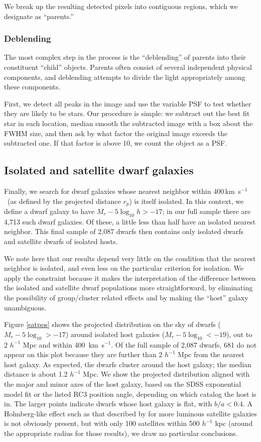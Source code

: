 \documentclass[10pt,preprint]{aastex}
\newcommand{\kms}{\,km~s$^{-1}$}
\begin{document}
We break up the resulting detected pixels into contiguous regions,
which we designate as ``parents.''

\subsubsection{Deblending}

The most complex step in the process is the ``deblending'' of parents
into their constituent ``child'' objects. Parents often consist of
several independent physical components, and deblending attempts to
divide the light appropriately among these components.

First, we detect all peaks in the image and use the variable PSF to
test whether they are likely to be stars. Our procedure is simple: we
subtract out the best fit star in each location, median smooth the
subtracted image with a box about the FWHM size, and then ask by what
factor the original image exceeds the subtracted one.  If that factor
is above 10, we count the object as a PSF. 

\subsection{ Isolated and satellite dwarf galaxies}

Finally, we search for dwarf galaxies whose nearest neighbor within
400\kms\ (as defined by the projected distance $r_p$) is itself
isolated.  In this context, we define a dwarf galaxy to have $M_r -
5\log_{10} h > -17$; in our full sample there are 4,713 such dwarf
galaxies. Of these, a little less than half have an isolated nearest
neighbor. This final sample of 2,087 dwarfs then contains only
isolated dwarfs and satellite dwarfs of isolated hosts.

We note here that our results depend very little on the condition that
the nearest neighbor is isolated, and even less on the particular
criterion for isolation.  We apply the constraint because it makes the
interpretation of the difference between the isolated and satellite
dwarf populations more straightforward, by eliminating the possibility
of group/cluster related effects and by making the ``host'' galaxy
unambiguous.

Figure \ref{satpos} shows the projected distribution on the sky of
dwarfs ($M_r - 5\log_{10}>-17$) around isolated host galaxies ($M_r -
5\log_{10}<-19$), out to 2 $h^{-1}$ Mpc and within 400 \kms. Of the
full sample of 2,087 dwarfs, 681 do not appear on this plot because
they are further than 2 $h^{-1}$ Mpc from the nearest host galaxy. As
expected, the dwarfs cluster around the host galaxy; the median
distance is about 1.2 $h^{-1}$ Mpc. We show the projected distribution
aligned with the major and minor axes of the host galaxy, based on the
SDSS exponential model fit or the listed RC3 position angle, depending
on which catalog the host is in. The larger points indicate dwarfs
whose host galaxy is flat, with $b/a<0.4$. A Holmberg-like effect such
as that described by \citet{bailyn07a} for more luminous satellite
galaxies is not obviously present, but with only 100 satellites within
500 $h^{-1}$ kpc (around the appropriate radius for those results), we
draw no particular conclusions.
\end{document}
